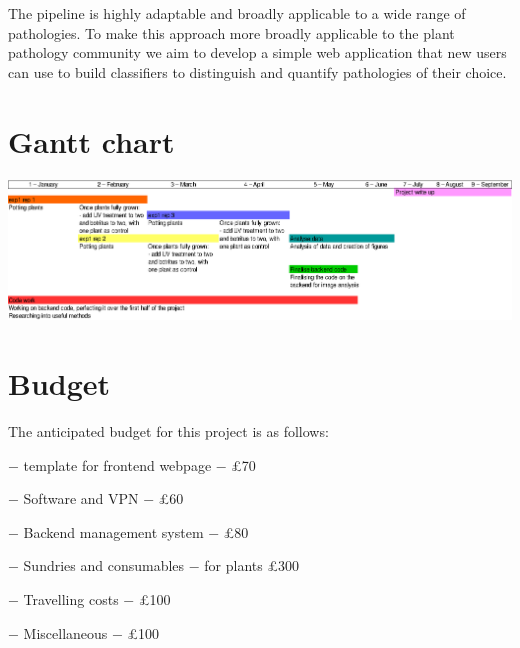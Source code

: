 \documentclass[a4paper]{article}
\begin{document}
    The pipeline is highly adaptable and broadly applicable to a wide range of pathologies. To make this approach more 
    broadly applicable to the plant pathology community we aim to develop a simple web application that new users
    can use to build classifiers to distinguish and quantify pathologies of their choice.
    
	
	\section{Gantt chart}
	\includegraphics[width =\textwidth]{gantt_chart.eps}
	
	\section{Budget}
	
	The anticipated budget for this project is as follows:
	\vspace{2mm}
	
	$-$ template for frontend webpage $-$ \pounds70
	\vspace{3mm}
	
    $-$ Software and VPN $-$ \pounds60
    \vspace{3mm}
  
    $-$ Backend management system $-$ \pounds80 
    \vspace{3mm}
  
    $-$ Sundries and consumables $-$ for plants \pounds300
    \vspace{3mm}
  
    $-$ Travelling costs $-$ \pounds100
    \vspace{3mm}
  
    $-$ Miscellaneous $-$ \pounds100
  
  \printbibliography
\end{document}
